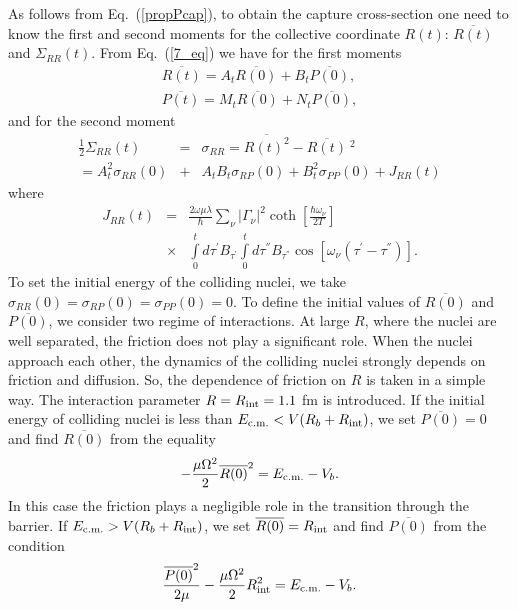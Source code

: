 \documentclass[preprint,review,12pt]{elsarticle}
\begin{document}
  As follows from Eq.~(\ref{propPcap}), to obtain the capture cross-section one need to know the first and second moments for the collective coordinate $R(t)$:
  $\overline{R(t)}$ and $\Sigma_{RR}(t)$.
  From Eq.~(\ref{7_eq}) we have for the first moments
  \begin{eqnarray}
  \overline{R(t)}=A_t\overline{R(0)} + B_t \overline{P(0)}, \nonumber\\
  \overline{P(t)}=M_t \overline{R(0)} + N_t \overline{P(0)},
  \label{8_eq}
  \end{eqnarray}
  and for the second moment
  \begin{eqnarray}
  \frac{1}{2}\Sigma_{RR}(t)&=&\sigma_{RR}=\overline{R(t)^2}-\overline{R(t)}\ ^2\nonumber\\
  =A_t^2\sigma_{RR}(0)&+&A_t B_t\sigma_{RP}(0)+B_t^2\sigma_{PP}(0)+J_{RR}(t)
  \end{eqnarray}
  where
  \begin{eqnarray}
  J_{RR}(t)&=&\frac{2\omega\mu\lambda}{\hbar}
  \sum_{\nu}^{}|\Gamma_\nu|^2\coth\left[\frac{\hbar\omega_\nu}{2T}\right]  \nonumber\\
&\times& \int\limits_{0}^{t}
  d\tau^{'}B_{\tau^{'}}  \int\limits_{0}^{t} d\tau^{''}B_{\tau^{''}}
  \cos[\omega_\nu (\tau^{'}-\tau^{''})].
  \label{Jrr}
  \end{eqnarray}
  To set the initial energy of the colliding nuclei, we take $\sigma_{RR}(0)=\sigma_{RP}(0)=\sigma_{PP}(0)=0$.
  To define the initial values of $\overline{R(0)}$ and $\overline{P(0)}$, we consider two regime of interactions.
  At large $R$, where the nuclei are well separated, 
  the friction does not play a significant role. When the nuclei approach each other,
  the dynamics of the colliding nuclei strongly depends on friction and diffusion. 
  So, the dependence of friction on $R$ is taken in a simple way.
  The interaction parameter $R=R_{\rm int}=1.1$ fm is introduced. If the initial energy of colliding nuclei is less than
  $E_{\rm c.m.}<V(R_b+R_{\rm int})$, we set $\overline{P(0)}=0$ and find $\overline{R(0)}$ from the equality 
  $$-\dfrac{\mu \Omega^2}{2}\overline{R(0)}^2=E_{\rm c.m.}-V_b.$$
  In this case the friction plays a negligible role in the transition through the
  barrier.
  If $E_{\rm c.m.}>V(R_b+R_{\rm int})$, we set $\overline{R(0)}=R_{\rm int}$ and find $\overline{P(0)}$ 
  from the condition
  $$\dfrac{\overline{P(0)}^2}{2 \mu}-\dfrac{\mu \Omega^2}{2}R_{\rm int}^2=E_{\rm c.m.}-V_b.$$
\end{document}
